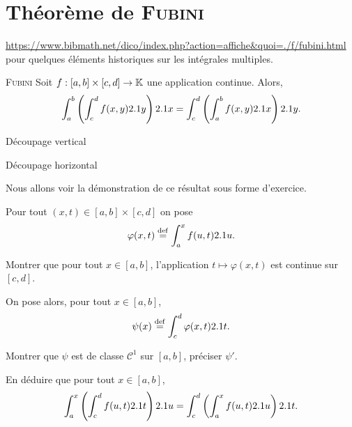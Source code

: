 \section{Théorème de \textsc{Fubini}}

\url{https://www.bibmath.net/dico/index.php?action=affiche&quoi=./f/fubini.html} pour quelques éléments historiques sur les intégrales multiples. 

\begin{theo}{\textsc{Fubini}}
    Soit $f: [a,b] \times [c, d] \to \mathbb{K}$ une application continue. Alors,
    $$\int_{a}^{b} \left ( \int_{c}^{d} f(x,y) 2.1 y \right) 2.1 x = \int_{c}^{d} \left ( \int_{a}^{b} f(x,y) 2.1 x \right) 2.1 y.$$
\end{theo}

\begin{marginfigure}[0cm]
    \centering
    
    \caption{Découpage vertical}
\end{marginfigure}
\begin{marginfigure}[5cm]
    \centering
    
    \caption{Découpage horizontal}
\end{marginfigure}

Nous allons voir la démonstration de ce résultat sous forme d'exercice.

\begin{exercice}
    Pour tout $(x, t) \in [a, b] \times [c, d]$ on pose 
    $$\varphi(x, t) \overset{\mathrm{\tiny def}}{=} \int_{a}^{x} f(u, t) 2.1 u.$$
    \begin{questions}
    \item Montrer que pour tout $x \in [a, b]$, l'application $t \mapsto \varphi(x, t)$ est continue sur $[c, d]$.
    \end{questions}

    On pose alors, pour tout $x  \in [a, b]$,
    $$\psi(x) \overset{\mathrm{\tiny def}}{=} \int_{c}^{d} \varphi(x, t) 2.1 t.$$
    \begin{questions}[resume]
        \item Montrer que $\psi$ est de classe $\mathscr{C}^1$ sur $[a, b]$, préciser $\psi'$.
        \item En déduire que pour tout $x \in [a, b]$,
        $$\int_{a}^{x} \left( \int_{c}^{d} f(u,t) 2.1 t \right) 2.1 u = \int_{c}^{d} \left( \int_{a}^{x} f(u,t) 2.1 u \right) 2.1 t.$$
    \end{questions}
\end{exercice}

